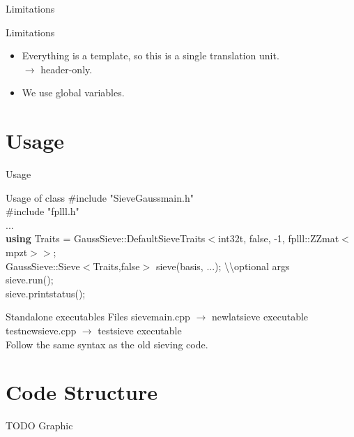 \documentclass{beamer}
\begin{document}
\begin{frame}{Limitations}
\begin{block}{Limitations}
\begin{itemize}
 \item Everything is a template, so this is a single translation unit.\\
 $\longrightarrow$ header-only.
 \item We use global variables.
\end{itemize}
\end{block}
\end{frame}

\section{Usage}

\begin{frame}{Usage}
\begin{block}{Usage of class}
 $\#$include "SieveGauss\textunderscore main.h"\\
 $\#$include "fplll.h"\\
 ...\\
 \textbf{using} Traits = GaussSieve::DefaultSieveTraits$<$int32\textunderscore t, false, -1, fplll::ZZ\textunderscore  mat$<$mpz\textunderscore t$>>$;\\
 GaussSieve::Sieve$<$Traits,false$>$ sieve(basis, ...); \textbackslash\textbackslash optional args\\
 sieve.run();\\
 sieve.print\textunderscore status();
\end{block}
\begin{block}{Standalone executables}
Files sieve\textunderscore main.cpp $\rightarrow$ newlatsieve executable\\
test\textunderscore newsieve.cpp $\rightarrow$ testsieve executable\\
Follow the same syntax as the old sieving code.
\end{block}
\end{frame}

\section{Code Structure}

\begin{frame}{TODO}
Graphic
\end{frame}
\end{document}
